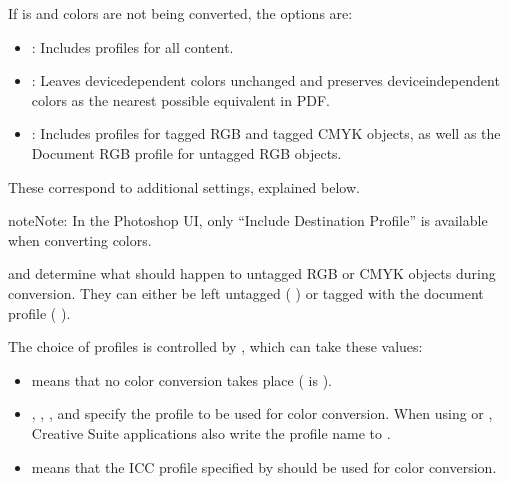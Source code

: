 \documentclass[letterpaper,12pt,english,openany,oneside]{sphinxmanual}
\begin{document}
If  is  and colors are not being converted, the options are:
\begin{itemize}
\item {} 
 : Includes profiles for all content.

\item {} 
 : Leaves device\sphinxhyphen{}dependent colors unchanged and preserves device\sphinxhyphen{}independent colors as the nearest possible equivalent in PDF.

\item {} 
 : Includes profiles for tagged RGB and tagged CMYK objects, as well as the Document RGB profile for untagged RGB objects.

\end{itemize}

These correspond to additional settings, explained below.

\begin{sphinxadmonition}{note}{Note:}
In the Photoshop UI, only “Include Destination Profile” is available when converting colors.
\end{sphinxadmonition}

 and  determine what should happen to untagged RGB or CMYK objects during conversion. They can either be left untagged ( ) or tagged with the document profile ( ).

The choice of profiles is controlled by  , which can take these values:
\begin{itemize}
\item {} 
 means that no color conversion takes place ( is  ).

\item {} 
 ,  ,  , and  specify the profile to be used for color conversion. When using  or  , Creative Suite applications also write the profile name to  .

\item {} 
 means that the ICC profile specified by  should be used for color conversion.

\end{itemize}
\end{document}
